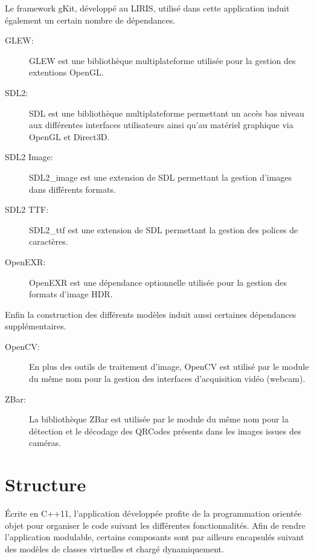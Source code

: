 \documentclass[10pt,a4paper,twoside, twocolumn]{report}
\begin{document}
Le framework gKit, développé au LIRIS, utilisé dans cette application induit également un certain nombre de dépendances.

\begin{description}
	\item[GLEW:] GLEW est une bibliothèque multiplateforme utilisée pour la gestion des extentions OpenGL.
	\item[SDL2:] SDL est une bibliothèque multiplateforme permettant un accès bas niveau aux différentes interfaces utilisateurs ainsi qu’au matériel graphique via OpenGL et Direct3D.
	\item[SDL2 Image:] SDL2\_image est une extension de SDL permettant la gestion d’images dans différents formats.
	\item[SDL2 TTF:] SDL2\_ttf est une extension de SDL permettant la gestion des polices de caractères.
	\item[OpenEXR:] OpenEXR est une dépendance optionnelle utilisée pour la gestion des formats d’image HDR.
\end{description}

Enfin la construction des différents modèles induit aussi certaines dépendances supplémentaires.

\begin{description}
	\item[OpenCV:] En plus des outils de traitement d’image, OpenCV est utilisé par le module du même nom pour la gestion des interfaces d’acquisition vidéo (webcam).
	\item[ZBar:] La bibliothèque ZBar est utilisée par le module du même nom pour la détection et le décodage des QRCodes présents dans les images issues des caméras.
\end{description}
 




\section{Structure}

Écrite en C++11, l’application développée profite de la programmation orientée objet pour organiser le code suivant les différentes fonctionnalités. Afin de rendre l’application modulable, certains composants sont par ailleurs encapsulés suivant des modèles de classes virtuelles et chargé dynamiquement.
\end{document}
